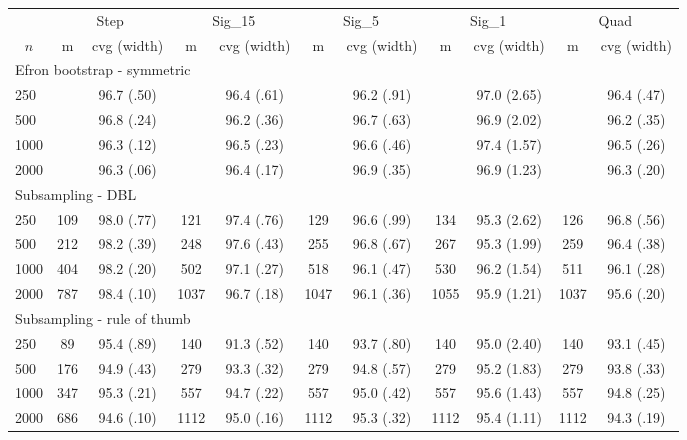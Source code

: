 \begin{tabular}{lcccccccccc}
   \toprule
 
           & \multicolumn{2}{c}{Step}& \multicolumn{2}{c}{Sig\_15}& \multicolumn{2}{c}{Sig\_5}& \multicolumn{2}{c}{Sig\_1}& \multicolumn{2}{c}{Quad} \\ 
             \cmidrule(l{2pt}r{2pt}){2-3} \cmidrule(l{2pt}r{2pt}){4-5} \cmidrule(l{2pt}r{2pt}){6-7} \cmidrule(l{2pt}r{2pt}){8-9} \cmidrule(l{2pt}r{2pt}){10-11}\multicolumn{1}{c}{$n$} & \multicolumn{1}{c}{m}& \multicolumn{1}{c}{cvg (width)}& \multicolumn{1}{c}{m}& \multicolumn{1}{c}{cvg (width)}& \multicolumn{1}{c}{m}& \multicolumn{1}{c}{cvg (width)}& \multicolumn{1}{c}{m}& \multicolumn{1}{c}{cvg (width)}& \multicolumn{1}{c}{m}& \multicolumn{1}{c}{cvg (width)} \\  
             \hline   
 \multicolumn{7}{l}{Efron bootstrap - symmetric} \\ 
250 &  & 96.7 (.50) &  & 96.4 (.61) &  & 96.2 (.91) &  & 97.0 (2.65) &  & 96.4 (.47) \\ 
  500 &  & 96.8 (.24) &  & 96.2 (.36) &  & 96.7 (.63) &  & 96.9 (2.02) &  & 96.2 (.35) \\ 
  1000 &  & 96.3 (.12) &  & 96.5 (.23) &  & 96.6 (.46) &  & 97.4 (1.57) &  & 96.5 (.26) \\ 
  2000 &  & 96.3 (.06) &  & 96.4 (.17) &  & 96.9 (.35) &  & 96.9 (1.23) &  & 96.3 (.20) \\ 
       \hline   
 \multicolumn{7}{l}{Subsampling - DBL} \\ 
250 & 109 & 98.0 (.77) & 121 & 97.4 (.76) & 129 & 96.6 (.99) & 134 & 95.3 (2.62) & 126 & 96.8 (.56) \\ 
  500 & 212 & 98.2 (.39) & 248 & 97.6 (.43) & 255 & 96.8 (.67) & 267 & 95.3 (1.99) & 259 & 96.4 (.38) \\ 
  1000 & 404 & 98.2 (.20) & 502 & 97.1 (.27) & 518 & 96.1 (.47) & 530 & 96.2 (1.54) & 511 & 96.1 (.28) \\ 
  2000 & 787 & 98.4 (.10) & 1037 & 96.7 (.18) & 1047 & 96.1 (.36) & 1055 & 95.9 (1.21) & 1037 & 95.6 (.20) \\ 
       \hline   
 \multicolumn{7}{l}{Subsampling - rule of thumb} \\ 
250 & 89 & 95.4 (.89) & 140 & 91.3 (.52) & 140 & 93.7 (.80) & 140 & 95.0 (2.40) & 140 & 93.1 (.45) \\ 
  500 & 176 & 94.9 (.43) & 279 & 93.3 (.32) & 279 & 94.8 (.57) & 279 & 95.2 (1.83) & 279 & 93.8 (.33) \\ 
  1000 & 347 & 95.3 (.21) & 557 & 94.7 (.22) & 557 & 95.0 (.42) & 557 & 95.6 (1.43) & 557 & 94.8 (.25) \\ 
  2000 & 686 & 94.6 (.10) & 1112 & 95.0 (.16) & 1112 & 95.3 (.32) & 1112 & 95.4 (1.11) & 1112 & 94.3 (.19) \\ 
   \hline
\end{tabular}
